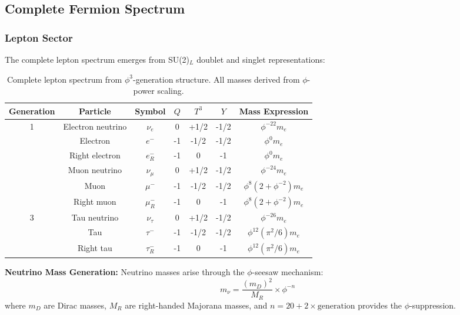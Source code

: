 \subsection{Complete Fermion Spectrum}

\subsubsection{Lepton Sector}

The complete lepton spectrum emerges from SU(2)$_L$ doublet and singlet representations:

\begin{table}[H]
\centering
\begin{tabular}{|c|c|c|c|c|c|c|}
\hline
\textbf{Generation} & \textbf{Particle} & \textbf{Symbol} & \textbf{$Q$} & \textbf{$T^3$} & \textbf{$Y$} & \textbf{Mass Expression} \\
\hline
\multirow{4}{*}{1} & Electron neutrino & $\nu_e$ & 0 & +1/2 & -1/2 & $\phi^{-22} m_e$ \\
& Electron & $e^-$ & -1 & -1/2 & -1/2 & $\phi^0 m_e$ \\
& Right electron & $e_R^-$ & -1 & 0 & -1 & $\phi^0 m_e$ \\
\hline
\multirow{4}{*}{2} & Muon neutrino & $\nu_\mu$ & 0 & +1/2 & -1/2 & $\phi^{-24} m_e$ \\
& Muon & $\mu^-$ & -1 & -1/2 & -1/2 & $\phi^8 (2 + \phi^{-2}) m_e$ \\
& Right muon & $\mu_R^-$ & -1 & 0 & -1 & $\phi^8 (2 + \phi^{-2}) m_e$ \\
\hline
\multirow{4}{*}{3} & Tau neutrino & $\nu_\tau$ & 0 & +1/2 & -1/2 & $\phi^{-26} m_e$ \\
& Tau & $\tau^-$ & -1 & -1/2 & -1/2 & $\phi^{12} (\pi^2/6) m_e$ \\
& Right tau & $\tau_R^-$ & -1 & 0 & -1 & $\phi^{12} (\pi^2/6) m_e$ \\
\hline
\end{tabular}
\caption{Complete lepton spectrum from $\phi^3$-generation structure. All masses derived from $\phi$-power scaling.}
\end{table}

\textbf{Neutrino Mass Generation:}
Neutrino masses arise through the $\phi$-seesaw mechanism:
\begin{equation}
m_\nu = \frac{(m_D)^2}{M_R} \times \phi^{-n}
\end{equation}
where $m_D$ are Dirac masses, $M_R$ are right-handed Majorana masses, and $n = 20 + 2 \times \text{generation}$ provides the $\phi$-suppression.


